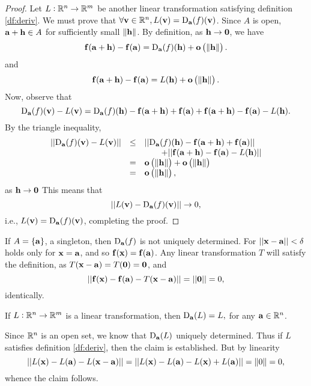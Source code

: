 \begin{proof}
Let $L:\mathbb{R}^n \rightarrow \mathbb{R}^m$ be another linear
transformation satisfying definition \ref{df:deriv}. We must prove
that $\forall {\mathbf v}\in\mathbb{R}^n,  L({\mathbf v}) =
{\mathrm{D}}_{{\mathbf a}}(f)({\mathbf v})$.
 Since $A$ is open, ${\mathbf a} + {\mathbf h}\in A$ for
sufficiently small ${\left\|{\mathbf h}\right\|}$. By definition, as ${\mathbf h}
\rightarrow {\mathbf 0}$, we have
$$ \mathbf{ f}({\mathbf a} + {\mathbf h}) - \mathbf{ f}({\mathbf a})= {\mathrm{D}}_{{\mathbf a}}(f)({\mathbf h}) + {\mathbf o}\left({\left\|{\mathbf h}\right\|}\right).$$
and
$$ \mathbf{ f}({\mathbf a} + {\mathbf h}) - \mathbf{ f}({\mathbf a})=  L({\mathbf h}) + {\mathbf o}\left({\left\|{\mathbf h}\right\|}\right).$$
Now, observe that
$${\mathrm{D}}_{{\mathbf a}}(f)({\mathbf v}) - L({\mathbf v}) =
{\mathrm{D}}_{{\mathbf a}}(f)({\mathbf h}) - \mathbf{ f}({\mathbf a} + {\mathbf h}) + \mathbf{ f}({\mathbf a})+
\mathbf{ f}({\mathbf a} + {\mathbf h}) - \mathbf{ f}({\mathbf a})- L({\mathbf h}) .$$ By the
triangle inequality,
$$\begin{array}{lll}
||{\mathrm{D}}_{{\mathbf a}}(f)({\mathbf v}) - L({\mathbf v})|| & \leq &
||{\mathrm{D}}_{{\mathbf a}}(f)({\mathbf h}) - \mathbf{ f}({\mathbf a} + {\mathbf h}) +
\mathbf{ f}({\mathbf a})||
\\ & & \qquad + ||\mathbf{ f}({\mathbf a} + {\mathbf h}) - \mathbf{ f}({\mathbf a})-
L({\mathbf h}) || \\
& = & {\mathbf o}\left({\left\|{\mathbf h}\right\|}\right) + {\mathbf o}\left({\left\|{\mathbf h}\right\|}\right) \\
& = & {\mathbf o}\left({\left\|{\mathbf h}\right\|}\right), \\
\end{array}$$as ${\mathbf h} \rightarrow {\mathbf 0}$
This means that
$$||L({\mathbf v}) - {\mathrm{D}}_{{\mathbf a}}(f)({\mathbf v})|| \rightarrow
0,$$i.e., $L({\mathbf v}) = {\mathrm{D}}_{{\mathbf a}}(f)({\mathbf v})$, completing the
proof.
\end{proof}
\begin{rem}
If $A = \{{\mathbf a}\}$, a singleton, then ${\mathrm{D}}_{{\mathbf a}}(f)$ is not
uniquely determined. For $||{\mathbf x} - {\mathbf a}|| < \delta$ holds
only for ${\mathbf x} = {\mathbf a}$, and so $\mathbf{ f}({\mathbf x}) =
\mathbf{ f}({\mathbf a})$. Any linear transformation $T$ will satisfy the
definition, as $T({\mathbf x} - {\mathbf a}) = T({\mathbf 0}) =
{\mathbf 0}$, and
$$||\mathbf{ f}({\mathbf x}) - \mathbf{ f}({\mathbf a})- T({\mathbf x} - {\mathbf a}) || = ||{\mathbf 0}|| = 0,$$
identically.
\end{rem}
\begin{exa}
If $L:\mathbb{R}^n \rightarrow \mathbb{R}^m$ is a linear transformation,
then ${\mathrm{D}}_{{\mathbf a}}(L) = L,$ for any ${\mathbf a} \in \mathbb{R}^n$.
\label{exa:derivlintran}\end{exa}\begin{solu} Since $\mathbb{R}^n$ is an
open set, we know that ${\mathrm{D}}_{{\mathbf a}}(L)$ uniquely determined. Thus if
$L$ satisfies definition \ref{df:deriv}, then the claim is
established. But by linearity
$$||L({\mathbf x}) - L({\mathbf a}) - L({\mathbf x} - {\mathbf a}) || = ||L({\mathbf x}) - L({\mathbf a}) - L({\mathbf x}) + L({\mathbf a}) ||
= {\left\|0\right\|} = 0, $$whence the claim follows.
\end{solu}

